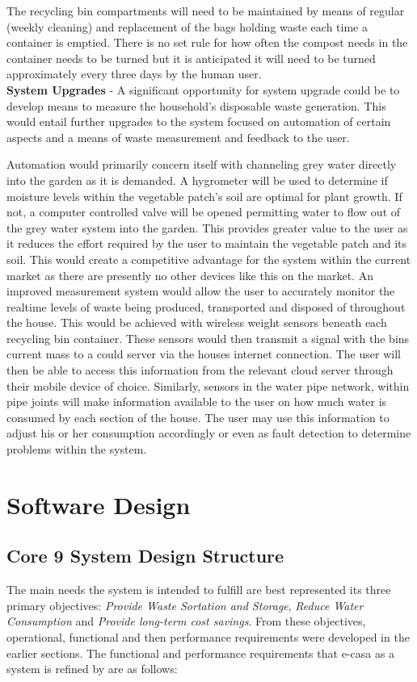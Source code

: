 \documentclass[a4paper,11pt,fleqn]{report}
\begin{document}
The recycling bin compartments will need to be maintained by means of regular (weekly cleaning) and replacement of the bags holding waste each time a container is emptied. There is no set rule for how often the compost needs in the container needs to be turned but it is anticipated it will need to be turned approximately every three days by the human user. \\

\textbf{System Upgrades} - A significant opportunity for system upgrade could be to develop means to measure the household's disposable waste generation. This would entail further upgrades to the system focused on automation of certain aspects and a means of waste measurement and feedback to the user. 

Automation would primarily concern itself with channeling grey water directly into the garden as it is demanded. A hygrometer will be used to determine if moisture levels within the vegetable patch's soil are optimal for plant growth. If not, a computer controlled valve will be opened permitting water to flow out of the grey water system into the garden. This provides greater value to the user as it reduces the effort required by the user to maintain the vegetable patch and its soil. This would create a competitive advantage for the system within the current market as there are presently no other devices like this on the market.
An improved measurement system would allow the user to accurately monitor the realtime levels of waste being produced, transported and disposed of throughout the house. This would be achieved with wireless weight sensors beneath each recycling bin container. These sensors would then transmit a signal with the bins current mass to a could server via the houses internet connection. The user will then be able to access this information from the relevant cloud server through their mobile device of choice. Similarly, sensors in the water pipe network, within pipe joints will make information available to the user on how much water is consumed by each section of the house. The user may use this information to adjust his or her consumption accordingly or even as fault detection to determine problems within the system. 

\chapter{Software Design}

\section{Core 9 System Design Structure}
The main needs the system is intended to fulfill are best represented its three primary objectives: \textit{Provide Waste Sortation and Storage}, \textit{Reduce Water Consumption} and \textit{Provide long-term cost savings}. From these objectives, operational, functional and then performance requirements were developed in the earlier sections. The functional and performance requirements that \ac{e-casa} as a system is refined by are as follows:
\end{document}
